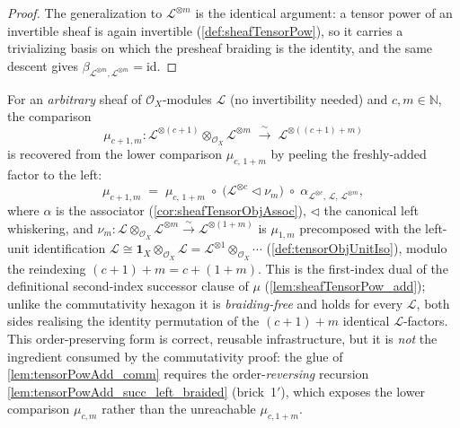 \begin{proof}
  The generalization to \(\mathcal{L}^{\otimes m}\) is the identical argument: a
  tensor power of an invertible sheaf is again invertible
  (\cref{def:sheafTensorPow}), so it carries a trivializing basis on which the
  presheaf braiding is the identity, and the same descent gives
  \(\beta_{\mathcal{L}^{\otimes m},\mathcal{L}^{\otimes m}} = \mathrm{id}\).
\end{proof}

\begin{lemma}\leanok
  \label{lem:tensorPowAdd_succ_left}
  For an \emph{arbitrary} sheaf of \(\mathcal{O}_X\)-modules \(\mathcal{L}\) (no
  invertibility needed) and \(c, m \in \mathbb{N}\), the comparison
  \[
    \mu_{c+1,m} : \mathcal{L}^{\otimes(c+1)} \otimes_{\mathcal{O}_X}
      \mathcal{L}^{\otimes m} \;\xrightarrow{\ \sim\ }\;
      \mathcal{L}^{\otimes((c+1)+m)}
  \]
  is recovered from the lower comparison \(\mu_{c,\,1+m}\) by peeling the
  freshly-added factor to the left:
  \[
    \mu_{c+1,m}
      \;=\;
      \mu_{c,\,1+m}
      \;\circ\;
      \bigl(\mathcal{L}^{\otimes c} \lhd \nu_m\bigr)
      \;\circ\;
      \alpha_{\mathcal{L}^{\otimes c},\,\mathcal{L},\,\mathcal{L}^{\otimes m}},
  \]
  where \(\alpha\) is the associator (\cref{cor:sheafTensorObjAssoc}), \(\lhd\)
  the canonical left whiskering, and
  \(\nu_m : \mathcal{L} \otimes_{\mathcal{O}_X} \mathcal{L}^{\otimes m}
  \xrightarrow{\sim} \mathcal{L}^{\otimes(1+m)}\) is \(\mu_{1,m}\) precomposed
  with the left-unit identification \(\mathcal{L} \cong
  \mathbf{1}_X \otimes_{\mathcal{O}_X}\mathcal{L} = \mathcal{L}^{\otimes 1}
  \otimes_{\mathcal{O}_X} \cdots\) (\cref{def:tensorObjUnitIso}), modulo the
  reindexing \((c+1)+m = c+(1+m)\). This is the first-index dual of the
  definitional second-index successor clause of \(\mu\)
  (\cref{lem:sheafTensorPow_add}); unlike the commutativity hexagon it is
  \emph{braiding-free} and holds for every \(\mathcal{L}\), both sides realising
  the identity permutation of the \((c+1)+m\) identical \(\mathcal{L}\)-factors.
  This order-preserving form is correct, reusable infrastructure, but it is
  \emph{not} the ingredient consumed by the commutativity proof: the glue of
  \cref{lem:tensorPowAdd_comm} requires the order-\emph{reversing} recursion
  \cref{lem:tensorPowAdd_succ_left_braided} (brick~1\('\)), which exposes the lower
  comparison \(\mu_{c,m}\) rather than the unreachable \(\mu_{c,1+m}\).
\end{lemma}

